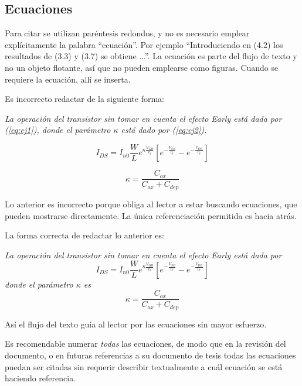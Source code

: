 \subsection{Ecuaciones}

Para citar  se utilizan paréntesis redondos, y no es
necesario emplear explícitamente la palabra ``ecuación''. Por ejemplo
``Introduciendo en (4.2) los resultados de (3.3) y (3.7) se obtiene
...''. La ecuación es parte del flujo de texto y no un objeto
flotante, así que no pueden emplearse como figuras. Cuando se requiere
la ecuación, allí se inserta.

Es incorrecto redactar de la siguiente forma: 

\textsl{La operación del transistor sin tomar en cuenta el efecto Early está
  dada por (\ref{eq:ej1}), donde el parámetro $\kappa$ está dado por
  (\ref{eq:ej2}).}

\begin{equation} \label{eq:ej1}
  I_{DS}
  =
  I_{n0} \frac{W}{L}e^{\kappa \frac{V_{GB}}{v_t}}
  \left[
    e^{-\frac{V_{SB}}{v_t}}
    -
    e^{-\frac{V_{DB}}{v_t}}
  \right]
\end{equation}

\begin{equation} \label{eq:ej2}
  \kappa = \frac{C_{ox}}{C_{ox}+C_{dep}}
\end{equation}

Lo anterior es incorrecto porque obliga al lector a estar buscando ecuaciones,
que pueden mostrarse directamente.  La única referenciación permitida es hacia
atrás.

La forma correcta de redactar lo anterior es: 

\textsl{La operación del transistor sin tomar en cuenta el efecto Early está
  dada por}
\begin{equation} \label{eq:ej3}
  I_{DS}
  =
  I_{n0} \frac{W}{L}e^{\kappa \frac{V_{GB}}{v_t}}
  \left[
    e^{-\frac{V_{SB}}{v_t}}
    -
    e^{-\frac{V_{DB}}{v_t}}
  \right]
\end{equation}
\textsl{donde el parámetro $\kappa$ es}
\begin{equation} \label{eq:ej4}
  \kappa = \frac{C_{ox}}{C_{ox}+C_{dep}}
\end{equation}

Así el flujo del texto guía al lector por las ecuaciones sin mayor esfuerzo.

Es recomendable numerar \emph{todas} las ecuaciones, de modo que en la revisión
del documento, o en futuras referencias a su documento de tesis todas las
ecuaciones puedan ser citadas sin requerir describir textualmente a cuál
ecuación se está haciendo referencia.

